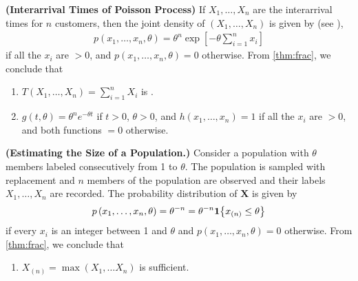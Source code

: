 \documentclass{article}
\newcommand{\bfs}[1]{\textbf{({#1}) }}
\begin{document}
\begin{exma}\bfs{Interarrival Times of Poisson Process}
If $X_{1}, \ldots, X_{n}$ are the interarrival times for $n$ customers, then the joint density of $\left(X_{1}, \ldots, X_{n}\right)$ is given by (see \cite[A.16.4]{Rice}),
\begin{align*}
p\left(x_{1}, \ldots, x_{n}, \theta\right)=\theta^{n} \exp \left[-\theta \sum_{i=1}^{n} x_{i}\right]
\end{align*}
if all the $x_{i}$ are $>0$, and $p\left(x_{1}, \ldots, x_{n}, \theta\right)=0$ otherwise. From \cref{thm:frac}, we conclude that 
\begin{enumerate}
    \item $T\left(X_{1}, \ldots, X_{n}\right)=\sum_{i=1}^{n} X_{i}$ is . 
    \item $g(t, \theta)=\theta^{n} e^{-\theta t}$ if $t>0$, $\theta>0$, and $h\left(x_{1}, \ldots, x_{n}\right)=1$ if all the $x_{i}$ are $>0$, and both functions $=0$ otherwise. 
\end{enumerate}
\end{exma}

\begin{exma}\bfs{Estimating the Size of a Population.}
 Consider a population with $\theta$ members labeled consecutively from 1 to $\theta$. The population is sampled with replacement and $n$ members of the population are observed and their labels $X_{1}, \ldots, X_{n}$ are recorded. 
 The probability distribution of $\mathbf{X}$ is given by
\begin{align*}
p\left(x_{1}, \ldots, x_{n}, \theta\right)=\theta^{-n}  = \theta^{-n} \indicate{x_{(n)} \leq \theta}
\end{align*}
if every $x_{i}$ is an integer between 1 and $\theta$ and $p\left(x_{1}, \ldots, x_{n}, \theta\right)=0$ otherwise.   From \cref{thm:frac}, we conclude that 
\begin{enumerate}
     \item $X_{(n)}=\max \left(X_{1}, \ldots X_{n}\right)$ is sufficient. 
 \end{enumerate} 
\end{exma}
\end{document}
